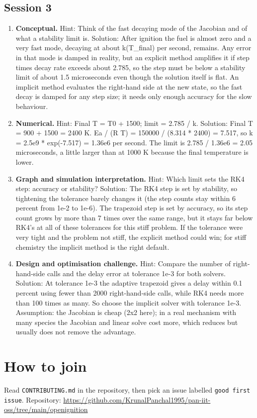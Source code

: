 \documentclass[11pt,a4paper]{article}
\begin{document}
\subsection*{Session 3}
\begin{enumerate}[nosep]
\item \textbf{Conceptual.} Hint: Think of the fast decaying mode of the Jacobian and of what a stability limit is. Solution: After ignition the fuel is almost zero and a very fast mode, decaying at about k(T\_final) per second, remains. Any error in that mode is damped in reality, but an explicit method amplifies it if step times decay rate exceeds about 2.785, so the step must be below a stability limit of about 1.5 microseconds even though the solution itself is flat. An implicit method evaluates the right-hand side at the new state, so the fast decay is damped for any step size; it needs only enough accuracy for the slow behaviour.
\item \textbf{Numerical.} Hint: Final T = T0 + 1500; limit = 2.785 / k. Solution: Final T = 900 + 1500 = 2400 K. Ea / (R T) = 150000 / (8.314 * 2400) = 7.517, so k = 2.5e9 * exp(-7.517) = 1.36e6 per second. The limit is 2.785 / 1.36e6 = 2.05 microseconds, a little larger than at 1000 K because the final temperature is lower.
\item \textbf{Graph and simulation interpretation.} Hint: Which limit sets the RK4 step: accuracy or stability? Solution: The RK4 step is set by stability, so tightening the tolerance barely changes it (the step counts stay within 6 percent from 1e-2 to 1e-6). The trapezoid step is set by accuracy, so its step count grows by more than 7 times over the same range, but it stays far below RK4's at all of these tolerances for this stiff problem. If the tolerance were very tight and the problem not stiff, the explicit method could win; for stiff chemistry the implicit method is the right default.
\item \textbf{Design and optimisation challenge.} Hint: Compare the number of right-hand-side calls and the delay error at tolerance 1e-3 for both solvers. Solution: At tolerance 1e-3 the adaptive trapezoid gives a delay within 0.1 percent using fewer than 2000 right-hand-side calls, while RK4 needs more than 100 times as many. So choose the implicit solver with tolerance 1e-3. Assumption: the Jacobian is cheap (2x2 here); in a real mechanism with many species the Jacobian and linear solve cost more, which reduces but usually does not remove the advantage.
\end{enumerate}

\section{How to join}
Read \texttt{CONTRIBUTING.md} in the repository, then pick an issue labelled \texttt{good first issue}. Repository: \url{https://github.com/KrunalPanchal1995/pan-iit-oss/tree/main/openignition}
\end{document}
